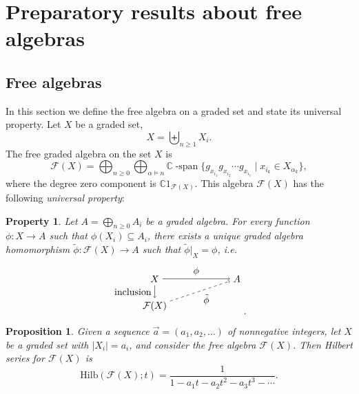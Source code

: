 \documentclass[11pt]{amsart}
\newtheorem{proposition}[theorem]{Proposition}
\newtheorem{property}[theorem]{Property}
\theoremstyle{definition}
\numberwithin{equation}{section}
\def\CC{{\mathbb C}}
\begin{document}
\section{Preparatory results about free algebras}

\subsection{Free algebras}
\label{sec:freealgebras}

In this section we define the free algebra on a graded set and state its universal property.  
Let $X$ be a graded set, 
\[
X = \biguplus_{n \ge 1} X_{i}.
\]
The free graded algebra on the set $X$ is 
\[
\mathcal{F}(X) = \bigoplus_{n \ge 0} \bigoplus_{\alpha \vDash n} 
\CC\operatorname{-span}\{g_{x_{i_{1}} }g_{x_{i_{2}}} \cdots g_{x_{i_{\ell}}} \;|\; x_{i_{k}} \in X_{\alpha_{k}}\},
\]
where the degree zero component is $\CC 1_{\mathcal{F}(X)}$.  This algebra $\mathcal{F}(X)$ has the following \emph{universal property}:

\begin{property}
Let $A = \bigoplus_{n \ge 0} A_{i}$ be a graded algebra.  For every function $\phi: X \to A$ such that $\phi(X_{i}) \subseteq A_{i}$, there exists a unique graded algebra homomorphism $\tilde{\phi}: \mathcal{F}(X) \to A$ such that $\tilde{\phi}|_{X} = \phi$, i.e.
\[
    \begin{tikzpicture}
        \node at (0, 0) (X) {$X$};
        \node at (3, 0) (F) {$A$};
        \node at (0, -1) (A) {$\mathcal{F}(X)$};
        \draw[->] (X) -- node[above] {$\phi$} (F);
        \draw[->] (X) -- node[left] {inclusion} (A);
        \draw[->, dashed] (A) -- node[below right] {$\tilde{\phi}$} (F);
        \end{tikzpicture}.
\]
\end{property}


\begin{proposition}
Given a sequence $\vec{a} = (a_{1}, a_{2}, \ldots)$ of nonnegative integers, let $X$ be a graded set with $|X_{i}| = a_{i}$, and consider the free algebra $\mathcal{F}(X)$.  Then Hilbert series for $\mathcal{F}(X)$ is
\[
\mathrm{Hilb}(\mathcal{F}(X); t) =  \frac{1}{1 - a_{1}t - a_{2}t^{2} - a_{3}t^{3} - \cdots}.
\]
%
%
%
%
%
%
%
%
\end{proposition}
\end{document}
